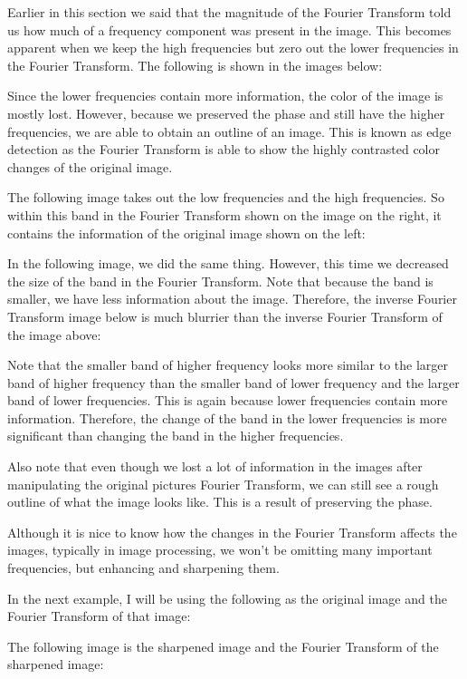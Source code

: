 \documentclass [../article.tex]{subfiles}
\begin{document}
  Earlier in this section we said that the magnitude of the Fourier
  Transform told us how much of a frequency component was present in
  the image.  This becomes apparent when we keep the high
  frequencies but zero out the lower frequencies in the Fourier
  Transform.  The following is shown in the images below:

  Since the lower frequencies contain more information, the color of
  the image is mostly lost.  However, because we preserved the phase
  and still have the higher frequencies, we are able to obtain an
  outline of an image.  This is known as edge detection as the
  Fourier Transform is able to show the highly contrasted color
  changes of the original image.

  The following image takes out the low frequencies and the high
  frequencies.  So within this band in the Fourier Transform shown
  on the image on the right, it contains the information of the
  original image shown on the left:

  In the following image, we did the same thing.  However, this time
  we decreased the size of the band in the Fourier Transform.  Note
  that because the band is smaller, we have less information about
  the image.  Therefore, the inverse Fourier Transform image below
  is much blurrier than the inverse Fourier Transform of the image
  above:

  Note that the smaller band of higher frequency looks more similar
  to the larger band of higher frequency than the smaller band of
  lower frequency and the larger band of lower frequencies.  This is
  again because lower frequencies contain more information.
  Therefore, the change of the band in the lower frequencies is more
  significant than changing the band in the higher frequencies.

  Also note that even though we lost a lot of information in the
  images after manipulating the original pictures Fourier Transform,
  we can still see a rough outline of what the image looks like.
  This is a result of preserving the phase.

  Although it is nice to know how the changes in the Fourier
  Transform affects the images, typically in image processing, we
  won’t be omitting many important frequencies, but enhancing and
  sharpening them.

  In the next example, I will be using the following as the original
  image and the Fourier Transform of that image:

  The following image is the sharpened image and the Fourier
  Transform of the sharpened image:
\end{document}
